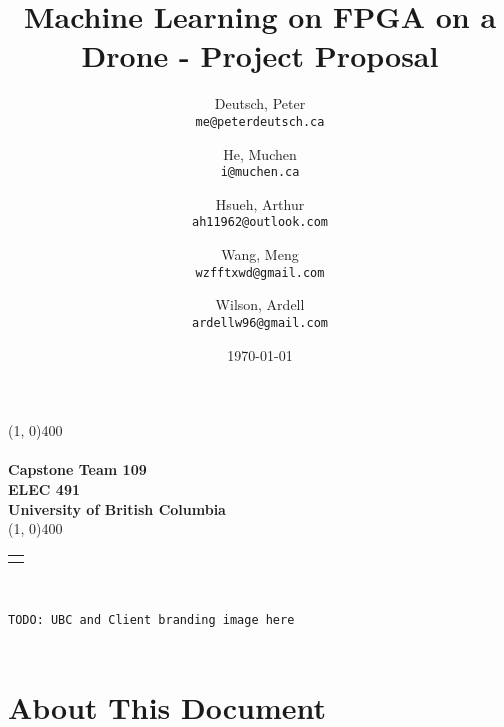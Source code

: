 \documentclass[10pt,letterpaper]{article}
\author{
	Deutsch, Peter\\
	\texttt{me@peterdeutsch.ca}
	\and
	He, Muchen\\
	\texttt{i@muchen.ca}
	\and
	Hsueh, Arthur\\
	\texttt{ah11962@outlook.com}
	\and
	Wang, Meng\\
	\texttt{wzfftxwd@gmail.com}
	\and
	Wilson, Ardell\\
	\texttt{ardellw96@gmail.com}
}
\title{Machine Learning on FPGA on a Drone - Project Proposal}
\date{\today}
\begin{document}
\makeatletter %
\begin{titlepage}
	\begin{center}
		\vspace*{1.25in}

		\line(1, 0){400}\\

		\Huge{\textbf{\@title}}\\[0.2cm]

		\large{\textbf{Capstone Team 109}}\\[1cm]

		\Large{\textbf{ELEC 491}}\\
		\textbf{University of British Columbia}\\

		\line(1, 0){400}\\[1cm]

		\begin{tabular}[t]{c}
			\@author
		\end{tabular}\\[2cm]

		\vfill

		\texttt{TODO: UBC and Client branding image here}\\[2cm]

		\@date\\
	\end{center}
\end{titlepage}
\makeatother

% 







\thispagestyle{empty}
\listoffigures
\listoftables
\newpage

\setcounter{page}{1}


\section{About This Document}
\end{document}
